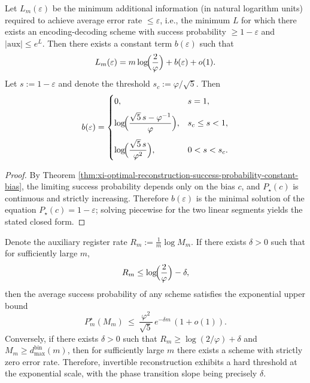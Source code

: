 \begin{corollary}\label{cor:xi-constant-bias-inversion-b-eps}
Let \(L_m(\varepsilon)\) be the minimum additional information (in natural logarithm units) required to achieve average error rate \(\le\varepsilon\), i.e., the minimum \(L\) for which there exists an encoding-decoding scheme with success probability \(\ge 1-\varepsilon\) and \(|\mathrm{aux}|\le e^{L}\).
Then there exists a constant term \(b(\varepsilon)\) such that
\[
L_m(\varepsilon)=m\log\!\Bigl(\frac{2}{\varphi}\Bigr)+b(\varepsilon)+o(1).
\]
Let \(s:=1-\varepsilon\) and denote the threshold \(s_c:=\varphi/\sqrt5\). Then
\[
b(\varepsilon)=
\begin{cases}
0, & s=1,\\[6pt]
\displaystyle \log\!\Bigl(\frac{\sqrt5\,s-\varphi^{-1}}{\varphi}\Bigr), & s_c\le s<1,\\[12pt]
\displaystyle \log\!\Bigl(\frac{\sqrt5\,s}{\varphi^2}\Bigr), & 0<s<s_c.
\end{cases}
\]
\end{corollary}

\begin{proof}
By Theorem \ref{thm:xi-optimal-reconstruction-success-probability-constant-bias}, the limiting success probability depends only on the bias \(c\), and \(P_\star(c)\) is continuous and strictly increasing.
Therefore \(b(\varepsilon)\) is the minimal solution of the equation \(P_\star(c)=1-\varepsilon\); solving piecewise for the two linear segments yields the stated closed form.
\end{proof}

\begin{theorem}\label{thm:xi-strong-converse-exponent-below-critical-rate}
Denote the auxiliary register rate \(R_m:=\frac{1}{m}\log M_m\).
If there exists \(\delta>0\) such that for sufficiently large \(m\),
\[
R_m\le \log\!\Bigl(\frac{2}{\varphi}\Bigr)-\delta,
\]
then the average success probability of any scheme satisfies the exponential upper bound
\[
P_m^\star(M_m)\ \le\ \frac{\varphi^2}{\sqrt5}\,e^{-\delta m}\,(1+o(1)).
\]
Conversely, if there exists \(\delta>0\) such that \(R_m\ge \log(2/\varphi)+\delta\) and \(M_m\ge d^{\mathrm{bin}}_{\max}(m)\), then for sufficiently large \(m\) there exists a scheme with strictly zero error rate.
Therefore, invertible reconstruction exhibits a hard threshold at the exponential scale, with the phase transition slope being precisely \(\delta\).
\end{theorem}

